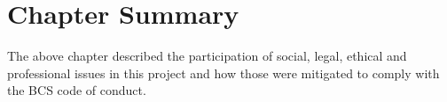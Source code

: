 \section{Chapter Summary}

The above chapter described the participation of social, legal, ethical and professional issues in this project and how those were mitigated to comply with the BCS code of conduct.
